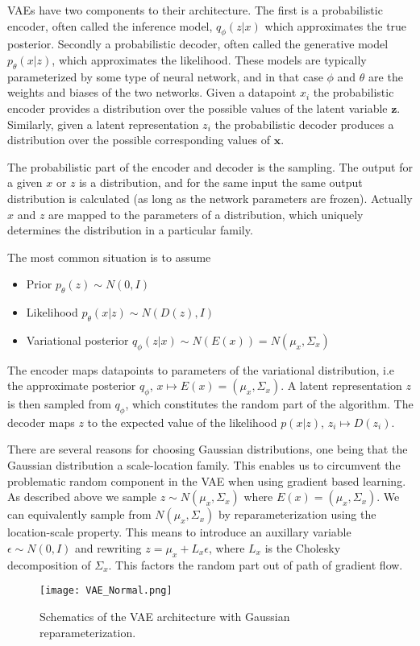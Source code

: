 \documentclass[../../thesis.tex]{subfiles}
\begin{document}
VAEs have two components to their architecture. The first is a probabilistic encoder, often called the inference model, $q_\phi(z|x)$ which approximates the true posterior. Secondly a probabilistic decoder, often called the generative model $p_\theta(x|z)$, which approximates the likelihood. These models are typically parameterized by some type of neural network, and in that case $\phi$ and $\theta$ are the weights and biases of the two networks. Given a datapoint $x_i$ the probabilistic encoder provides a distribution over the possible values of the latent variable $\mathbf{z}$. Similarly, given a latent representation $z_i$ the probabilistic decoder produces a distribution over the possible corresponding values of $\mathbf{x}$. \newline

The probabilistic part of the encoder and decoder is the sampling. The output for a given $x$ or $z$ is a distribution, and for the same input the same output distribution is calculated (as long as the network parameters are frozen). Actually $x$ and $z$ are mapped to the parameters of a distribution, which uniquely determines the distribution in a particular family.\newline

The most common situation is to assume 
\begin{itemize}
    \item Prior $p_\theta(z)\sim N(0,I)$
    \item Likelihood $p_\theta(x|z)\sim N(D(z), I)$
    \item Variational posterior $q_\phi(z|x)\sim N(E(x)) = N(\mu_x, \Sigma_x)$
\end{itemize}
The encoder maps datapoints to parameters of the variational distribution, i.e the approximate posterior $q_\phi$, $x \mapsto E(x) = (\mu_x, \Sigma_x)$. A latent representation $z$ is then sampled from $q_\phi$, which constitutes the random part of the algorithm. The decoder maps $z$ to the expected value of the likelihood $p(x|z)$, $z_i \mapsto D(z_i)$. \newline

There are several reasons for choosing Gaussian distributions, one being that the Gaussian distribution a scale-location family. This enables us to circumvent the problematic random component in the VAE when using gradient based learning. As described above we sample $z\sim N(\mu_x,\Sigma_x)$ where $E(x) = (\mu_x,\Sigma_x)$. We can equivalently sample from $N(\mu_x,\Sigma_x)$ by reparameterization using the location-scale property. This means to introduce an auxillary variable $\epsilon \sim N(0,I)$ and rewriting $z = \mu_x + L_x\epsilon $, where $L_x$ is the Cholesky decomposition of $\Sigma_x$. This factors the random part out of path of gradient flow.
\begin{figure}[h]
    \texttt{[image: VAE\_Normal.png]}
    \centering
    \caption{Schematics of the VAE architecture with Gaussian reparameterization.}
    \label{fig:VAE_Normal}
\end{figure}
\end{document}
